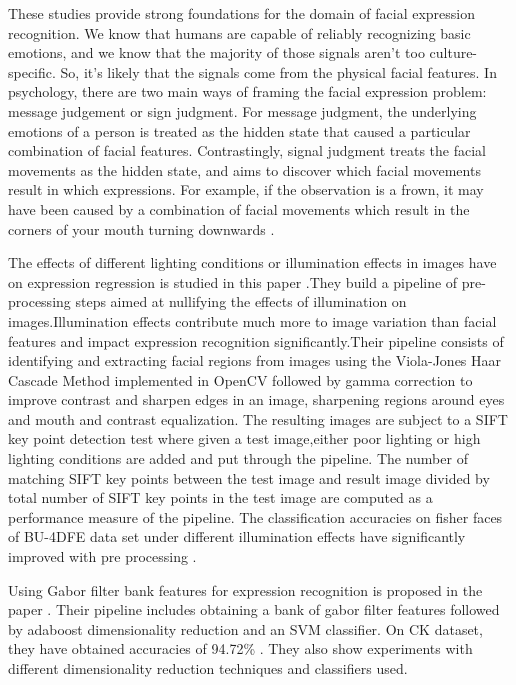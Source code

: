 \documentclass[10pt,twocolumn,letterpaper]{article}
\begin{document}
These studies provide strong foundations for the domain of facial expression recognition. We know that humans are capable of reliably recognizing basic emotions, and we know that the majority of those signals aren't too culture-specific. So, it's likely that the signals come from the physical facial features. In psychology, there are two main ways of framing the facial expression problem: message judgement or sign judgment. For message judgment, the underlying emotions of a person is treated as the hidden state that caused a particular combination of facial features. Contrastingly, signal judgment treats the facial movements as the hidden state, and aims to discover which facial movements result in which expressions. For example, if the observation is a frown, it may have been caused by a combination of facial movements which result in the corners of your mouth turning downwards \cite{metastudy}.

The effects of different lighting conditions or illumination effects in images have on expression regression is studied in this paper \cite{FERvariablelighting}.They build a pipeline of pre-processing steps aimed at nullifying the effects of illumination on images.Illumination effects contribute much more to image variation than facial features and impact expression recognition significantly.Their pipeline consists of identifying and extracting facial regions from images using the Viola-Jones Haar Cascade Method implemented in OpenCV followed by gamma correction to improve contrast and sharpen edges in an image, sharpening regions around eyes and mouth and contrast equalization. The resulting images are subject to a SIFT key point detection test where given a test image,either poor lighting or high lighting conditions are added and put through the pipeline. The number of matching SIFT key points between the test image and result image divided by total number of SIFT key points in the test image are computed as a performance measure of the pipeline. The classification accuracies on fisher faces of BU-4DFE data set under different illumination effects have significantly improved with pre processing .    

Using Gabor filter bank features for expression recognition is proposed in the paper \cite{VisualcuesFER}. Their pipeline includes obtaining a bank of gabor filter features followed by adaboost dimensionality reduction and an SVM classifier. On CK dataset, they have obtained accuracies of 94.72\% . They also show experiments with different dimensionality reduction techniques and classifiers used.
\end{document}
